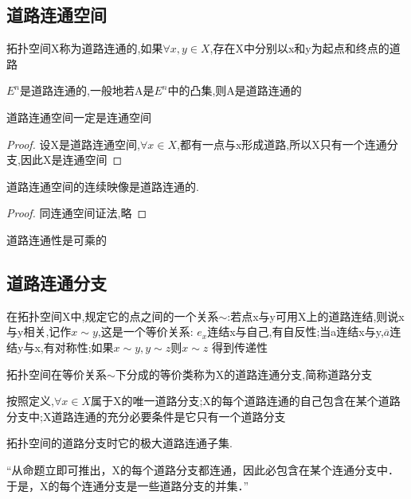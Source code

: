 \subsection*{道路连通空间}
\begin{definition}
    拓扑空间X称为道路连通的,如果\(\forall x,y \in X \),存在X中分别以x和y为起点和终点的道路
\end{definition}
\begin{example}
    \(E^n\)是道路连通的,一般地若A是\(E^n\)中的凸集,则A是道路连通的
\end{example}
\begin{corollary}
    道路连通空间一定是连通空间
\end{corollary}
\begin{proof}
    设X是道路连通空间,\(\forall x \in X \),都有一点与x形成道路,所以X只有一个连通分支,因此X是连通空间
\end{proof}
\begin{corollary}
    道路连通空间的连续映像是道路连通的.
\end{corollary}
\begin{proof}
    同连通空间证法,略
\end{proof}
\begin{theorem}
    道路连通性是可乘的
\end{theorem}
\subsection*{道路连通分支}
在拓扑空间X中,规定它的点之间的一个关系\(\sim\):若点x与y可用X上的道路连结,则说x与y相关,记作\(x \sim y\),这是一个等价关系: \(e_x\)连结x与自己,有自反性;当a连结x与y,\(\overline{a}\)连结y与x,有对称性;如果\(x \sim y ,y \sim z \)则\(x \sim z\)
得到传递性
\begin{definition}
    拓扑空间在等价关系\(\sim\)下分成的等价类称为X的道路连通分支,简称道路分支
\end{definition}
按照定义,\(\forall x \in X \)属于X的唯一道路分支;X的每个道路连通的自己包含在某个道路分支中;X道路连通的充分必要条件是它只有一个道路分支 
\begin{corollary}
    拓扑空间的道路分支时它的极大道路连通子集.
\end{corollary}
“从命题立即可推出，X的每个道路分支都连通，因此必包含在某个连通分支中．于是，X的每个连通分支是一些道路分支的并集．”
